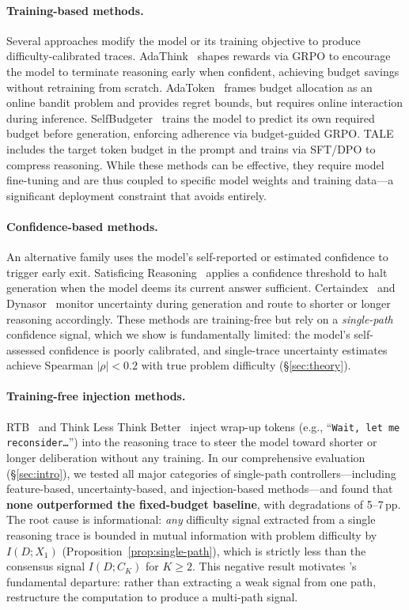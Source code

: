 \paragraph{Training-based methods.}
Several approaches modify the model or its training objective to produce difficulty-calibrated traces.
AdaThink~\citep{adathink2025} shapes rewards via GRPO to encourage the model to terminate reasoning early when confident, achieving budget savings without retraining from scratch.
AdaToken~\citep{adatoken2025} frames budget allocation as an online bandit problem and provides regret bounds, but requires online interaction during inference.
SelfBudgeter~\citep{liu2025selfbudgeter} trains the model to predict its own required budget before generation, enforcing adherence via budget-guided GRPO.
TALE~\citep{han2025tale} includes the target token budget in the prompt and trains via SFT/DPO to compress reasoning.
While these methods can be effective, they require model fine-tuning and are thus coupled to specific model weights and training data---a significant deployment constraint that \method{} avoids entirely.

\paragraph{Confidence-based methods.}
An alternative family uses the model's self-reported or estimated confidence to trigger early exit.
Satisficing Reasoning~\citep{luo2025satisficing} applies a confidence threshold to halt generation when the model deems its current answer sufficient.
Certaindex~\citep{luo2025certaindex} and Dynasor~\citep{fu2025dynasor} monitor uncertainty during generation and route to shorter or longer reasoning accordingly.
These methods are training-free but rely on a \emph{single-path} confidence signal, which we show is fundamentally limited: the model's self-assessed confidence is poorly calibrated, and single-trace uncertainty estimates achieve Spearman $|\rho| < 0.2$ with true problem difficulty (\S\ref{sec:theory}).

\paragraph{Training-free injection methods.}
RTB~\citep{hou2025thinkless} and Think Less Think Better~\citep{hou2025thinkless} inject wrap-up tokens (e.g., ``\texttt{Wait, let me reconsider\ldots}'') into the reasoning trace to steer the model toward shorter or longer deliberation without any training.
In our comprehensive evaluation (\S\ref{sec:intro}), we tested all major categories of single-path controllers---including feature-based, uncertainty-based, and injection-based methods---and found that \textbf{none outperformed the fixed-budget baseline}, with degradations of 5--7\,pp.
The root cause is informational: \emph{any} difficulty signal extracted from a single reasoning trace is bounded in mutual information with problem difficulty by $I(D; X_1)$ (Proposition~\ref{prop:single-path}), which is strictly less than the consensus signal $I(D; C_K)$ for $K \ge 2$.
This negative result motivates \method{}'s fundamental departure: rather than extracting a weak signal from one path, restructure the computation to produce a multi-path signal.

